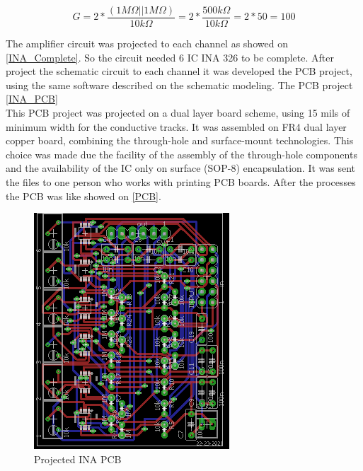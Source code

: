 \begin{equation}
  \label{Gain}
G=2*\frac{(1M\Omega||1M\Omega)}{10k\Omega}
=2*\frac{500k\Omega}{10k\Omega}
=2*50
=100
\end{equation}

The amplifier circuit was projected to each channel as showed on \autoref{INA_Complete}.
So the circuit needed 6 IC INA 326 to be complete.  After project
the schematic circuit to each channel it was developed the PCB project, using the
same software described on the schematic modeling. The PCB project \autoref{INA_PCB}\\


This PCB project \label{INA_PCB_doc} was projected on a dual layer board scheme, using 15 mils of
minimum width for the conductive tracks. It was assembled on FR4 dual layer copper
board, combining the through-hole and surface-mount technologies. This choice was
made due the facility of the assembly of the through-hole components and the availability
of the IC only on surface (SOP-8) encapsulation. It was sent
the files to one person who works with printing PCB boards. After the processes
the PCB was like showed on \autoref{PCB}.\\

\begin{figure}[!htpb]
\centering
\caption{Projected INA PCB}
\label{INA_PCB}
\includegraphics[scale=1.8]{images/TCC_INA}
\end{figure}

